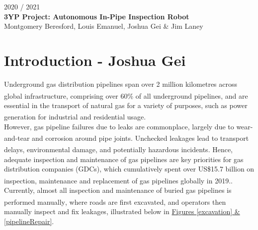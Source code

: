 \documentclass[11pt]{article}		%
\newcommand{\supercite}[1]{\textsuperscript{\cite{#1}}}		%
\begin{document}
	
	\flushleft
	\raggedright

	\begin{center}
		\vspace*{2cm}
		2020 / 2021\\ %
		\vspace*{6cm}
		\huge{\textbf{3YP Project: Autonomous In-Pipe Inspection Robot}}\\ 
		\vspace*{6cm}
		\large{Montgomery Beresford, Louis Emanuel, Joshua Gei \& Jim Laney}
		\thispagestyle{empty} %
	\end{center}

	\newpage
	
	\pagestyle{empty}
	
	\setlength{\columnsep}{1.5cm} %
	\setlength{\columnseprule}{0.5pt} %
	
	\begin{multicols*}{2}
		\RaggedRight
	    \tableofcontents
    \end{multicols*}
	
	\setlength{\columnsep}{10pt} %
	\setlength{\columnseprule}{0pt} %
	
	\newpage
    \pagestyle{plain}
	\setcounter{page}{1}
	
	\section[Introduction]{Introduction - Joshua Gei}
	
		Underground gas distribution pipelines span over 2 million kilometres across global infrastructure, comprising over 60\% of all underground pipelines\supercite{sönnichsen_5_2021}, and are essential in the transport of natural gas for a variety of purposes, such as power generation for industrial and residential usage\supercite{group.met.com}. \\ \hspace*{3ex}
		However, gas pipeline failures due to leaks are commonplace, largely due to wear-and-tear and corrosion around pipe joints\supercite{corrosion1}. Unchecked leakages lead to transport delays, environmental damage, and potentially hazardous incidents\supercite{hazardousincidents}. Hence, adequate inspection and maintenance of gas pipelines are key priorities for gas distribution companies (GDCs), which cumulatively spent over US\$15.7 billion on inspection, maintenance  and replacement of gas pipelines globally in 2019.\supercite{ltd}. \\ \hspace*{3ex}
		Currently, almost all inspection and maintenance of buried gas pipelines is performed manually\supercite{manually}, where roads are first excavated, and operators then manually inspect and fix leakages, illustrated below in \hyperref[excavation]{Figures \ref*{excavation} \& \ref*{pipelineRepair}}.
\end{document}
